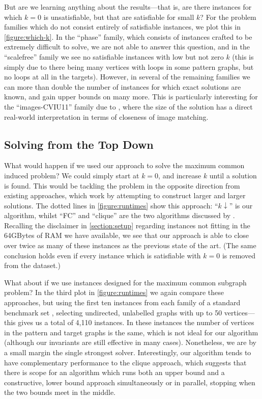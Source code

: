 \documentclass[letterpaper]{article}
\newcommand{\citet}[1]{\citeauthor{#1} \shortcite{#1}}
\newcommand{\citep}[1]{\cite{#1}}
\theoremstyle{definition}
\begin{document}
But are we learning anything about the results---that is, are there instances for which $k = 0$ is
unsatisfiable, but that are satisfiable for small $k$? For the problem families which do not consist
entirely of satisfiable instances, we plot this in \cref{figure:which-k}. In the ``phase'' family,
which consists of instances crafted to be extremely difficult to solve, we are not able to answer
this question, and in the ``scalefree'' family we see no satisfiable instances with low but not zero
$k$ (this is simply due to there being many vertices with loops in some pattern graphs, but no loops
at all in the targets). However, in several of the remaining families we can more than double the
number of instances for which exact solutions are known, and gain upper bounds on many more. This is
particularly interesting for the ``images-CVIU11'' family due to \citet{cviu11}, where the size of
the solution has a direct real-world interpretation in terms of closeness of image matching.

\subsection{Solving from the Top Down}\label{section:topdown}

What would happen if we used our approach to solve the maximum common induced problem? We could
simply start at $k = 0$, and increase $k$ until a solution is found. This would be tackling the
problem in the opposite direction from existing approaches, which work by attempting to construct
larger and larger solutions. The dotted lines in \cref{figure:runtimes} show this approach: ``$k
\downarrow$'' is our algorithm, whilst ``FC'' and ``clique'' are the two algorithms discussed by
\citet{DBLP:conf/cp/McCreeshNPS16}.  Recalling the disclaimer in \cref{section:setup}
regarding instances not fitting in the 64GBytes of RAM we have available, we see that our approach is
able to close over twice as many of these instances as the previous state of the art. (The same
conclusion holds even if every instance which is satisfiable with $k = 0$ is removed from the
dataset.)

What about if we use instances designed for the maximum common subgraph problem? In the third plot
in \cref{figure:runtimes} we again compare these approaches, but using the first ten instances from
each family of a standard benchmark set
\citep{DBLP:journals/prl/SantoFSV03,DBLP:journals/jgaa/ConteFV07}, selecting undirected, unlabelled
graphs with up to 50 vertices---this gives us a total of 4,110 instances. In these instances the
number of vertices in the pattern and target graphs is the same, which is not ideal for our
algorithm (although our invariants are still effective in many cases). Nonetheless, we are by a
small margin the single strongest solver. Interestingly, our algorithm tends to have complementary
performance to the clique approach, which suggests that there is scope for an algorithm which runs
both an upper bound and a constructive, lower bound approach simultaneously or in parallel, stopping
when the two bounds meet in the middle.
\end{document}
